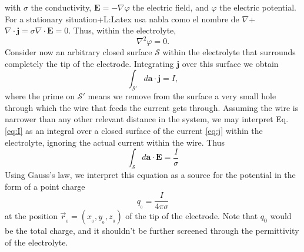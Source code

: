 \documentclass{article}
\newcommand{\notaL}[1]{{\color{blue}+L:#1+}}
\begin{document}
with
$\sigma$ the conductivity, $\bm E=-\nabla\varphi$ the electric field,
and $\varphi$ the electric potential. For a
stationary situation\notaL{Latex usa nabla como el nombre de
  $\nabla$}
$\nabla\cdot \bm j = \sigma\nabla\cdot\bm E=0$. Thus, within the electrolyte,
\begin{equation}
  \label{eq:laplace}
\nabla^{2} \varphi=0.
\end{equation}
Consider now an arbitrary closed surface
$\mathcal S$
within the electrolyte that surrounds completely the tip of the
electrode. Integrating $ \bm j$ over this surface we obtain
\begin{equation}
  \label{eq:I}
\int_{\mathcal S'} d\bm a \cdot \bm j = I,
\end{equation}
where the prime on $\mathcal S'$ means we remove from the surface a
very small hole through which the wire that feeds the current gets
through. Assuming the wire is narrower than any other relevant
distance in the system, we may interpret Eq. \eqref{eq:I} as an
integral over a closed surface of the current \eqref{eq:j} within the
electrolyte, ignoring the actual current within the wire. Thus
\begin{equation}
  \label{eq:gauss}
  \int_{\mathcal S} d\bm a \cdot \bm E = \frac{I}{\sigma}
\end{equation}
Using Gauss's law, we interpret this equation as a source for the
potential in the form of a point charge
\begin{equation}
  q_{_{0}} = \frac{I}{4 \pi \sigma}
\end{equation}
at the position $\vec{r}_{_{0}}=(x_{_{0}}, y_{_{0}}, z_{_{0}})$ of the
tip of the electrode. Note that $q_0$ would be the total charge,
and it shouldn't be further screened through the permittivity of the
electrolyte.
\end{document}
